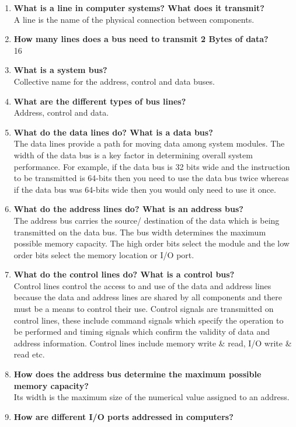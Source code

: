 \begin{enumerate}
    \item \textbf{What is a line in computer systems? What does it transmit?}\\
    A line is the name of the physical connection between components.
    \item \textbf{How many lines does a bus need to transmit 2 Bytes of data?}\\
    16
    \item \textbf{What is a system bus?}\\
    Collective name for the address, control and data buses.
    \item \textbf{What are the different types of bus lines?}\\
    Address, control and data.
    \item \textbf{What do the data lines do? What is a data bus?}\\
    The data lines provide a path for moving data among system modules. The width of the data bus is a key factor in determining overall system performance. For example, if the data bus is 32 bits wide and the instruction to be transmitted is 64-bits then you need to use the data bus twice whereas if the data bus was 64-bits wide then you would only need to use it once.
    \item \textbf{What do the address lines do? What is an address bus?}\\
    The address bus carries the source/ destination of the data which is being transmitted on the data bus. The bus width determines the maximum possible memory capacity. The high order bits select the module and the low order bits select the memory location or I/O port.
    \item \textbf{What do the control lines do? What is a control bus?}\\
    Control lines control the access to and use of the data and address lines because the data and address lines are shared by all components and there must be a means to control their use. Control signals are transmitted on control lines, these include command signals which specify the operation to be performed and timing signals which confirm the validity of data and address information. Control lines include memory write \& read, I/O write \& read etc.
    \item \textbf{How does the address bus determine the maximum possible memory capacity?}\\
    Its width is the maximum size of the numerical value assigned to an address.
    \item \textbf{How are different I/O ports addressed in computers? }\\

\end{enumerate}
